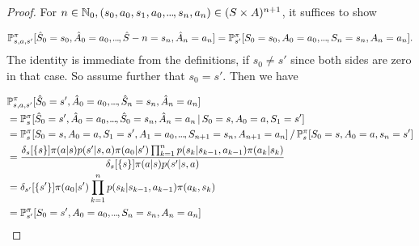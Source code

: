 \begin{proof}
    For \(  n  \in \mathbb{N}_{0}, (s_{0},a_{0},s_{1},a_{0},\kern-0.10em.\kern-0.06em.\kern-0.06em.\kern-0.1em,s_n,a_n) \in (S\times A)^{n+1} \), it suffices to show

    \[
        \mathbb{P}_{s,a,s'}^\pi [ \hat{S}_0 = s_{0}, \hat{A}_{0} = a_{0}, \kern-0.10em.\kern-0.06em.\kern-0.06em.\kern-0.1em, \hat{S}-n = s_n, \hat{A}_n = a_n] = \mathbb{P}_{s'}^\pi [S_0 = s_{0}, A_{0} = a_{0}, \kern-0.10em.\kern-0.06em.\kern-0.06em.\kern-0.1em, S_n = s_n, A_n = a_n].
    \]
    The identity is immediate from the definitions, if \( s_{0} \neq s' \) since both sides are zero in that case. So assume further that \( s_{0} = s' \).  
    Then we have

    \begin{align*}
        &\mathbb{P}_{s,a,s'}^\pi[\hat{S}_0 = s', \hat{A}_{0} = a_{0}, \kern-0.10em.\kern-0.06em.\kern-0.06em.\kern-0.1em, \hat{S}_n = s_n, \hat{A}_n = a_n] \\
        &= \mathbb{P}_s^\pi[ \hat{S}_{0} = s', \hat{A}_{0} = a_{0}, \kern-0.10em.\kern-0.06em.\kern-0.06em.\kern-0.1em, \hat{S}_{0} = s_n, \hat{A}_n = a_n \,|\, S_{0} = s, A_{0} = a, S_{1} = s'] \\
        &= \mathbb{P}_s^\pi [S_{0} =s, A_{0}= a, S_1 = s', A_{1} = a_{0}, \kern-0.10em.\kern-0.06em.\kern-0.06em.\kern-0.1em, S_{n+1} = s_n, A_{n+1} = a_n] \,/\, \mathbb{P}_s^\pi[S_0 = s, A_{0} = a, s_n = s']\\
        &= \frac{\delta_s[\left\{ s \right\}] \pi(a|s) p(s' | s,a) \pi(a_{0}|s') \prod_{k=1}^n p(s_k | s_{k-1}, a_{k-1}) \pi(a_k | s_k)}{\delta_s[\left\{ s \right\}] \pi(a | s) p(s' | s,a)} \\
        &= \delta_{s'}[\left\{ s' \right\}] \pi(a_{0} | s') \prod_{k=1}^n p(s_k | s_{k-1}, a_{k-1}) \pi(a_k, s_k) \\
        &= \mathbb{P}_{s'}^\pi[ S_{0} = s', A_{0} = a_{0}, \kern-0.10em.\kern-0.06em.\kern-0.06em.\kern-0.1em, S_n = s_n, A_n = a_n]\\ 
    \end{align*}
\end{proof}


